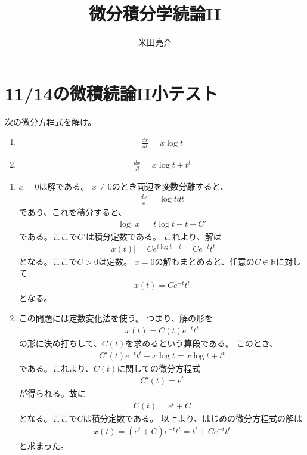 \documentclass{jsarticle}
\begin{document}
\title{微分積分学続論II}
\author{米田亮介}
\maketitle
\section{11/14の微積続論II小テスト}
\begin{shaded}
次の微分方程式を解け。
\begin{enumerate}
\item 
\begin{eqnarray}
\frac{dx}{dt}=x\log t
\end{eqnarray}
\item 
\begin{eqnarray}
\frac{dx}{dt}=x\log t+t^{t}
\end{eqnarray}
\end{enumerate}
\end{shaded}
\begin{enumerate}
\item 
$x=0$は解である。
$x\ne 0$のとき両辺を変数分離すると、
\begin{eqnarray}
\frac{dx}{x}=\log tdt
\end{eqnarray}
であり、これを積分すると、
\begin{eqnarray}
\log |x|=t\log t-t+C'
\end{eqnarray}
である。ここで$C'$は積分定数である。
これより、解は
\begin{eqnarray}
|x(t)|=Ce^{t\log t-t}=Ce^{-t}t^{t}
\end{eqnarray}
となる。ここで$C>0$は定数。
$x=0$の解もまとめると、任意の$C\in\mathbb{R}$に対して
\begin{eqnarray}
x(t)=Ce^{-t}t^{t}
\end{eqnarray}
となる。
\item
この問題には定数変化法を使う。
つまり、解の形を
\begin{eqnarray}
x(t)=C(t)e^{-t}t^{t}
\end{eqnarray}
の形に決め打ちして、$C(t)$を求めるという算段である。
このとき、
\begin{eqnarray}
C'(t)e^{-t}t^{t}+x\log t=x\log t+t^{t}
\end{eqnarray}
である。これより、$C(t)$に関しての微分方程式
\begin{eqnarray}
C'(t)=e^{t}
\end{eqnarray}
が得られる。故に
\begin{eqnarray}
C(t)=e^{t}+C
\end{eqnarray}
となる。ここで$C$は積分定数である。
以上より、はじめの微分方程式の解は
\begin{eqnarray}
x(t)=(e^{t}+C)e^{-t}t^{t}=t^{t}+Ce^{-t}t^{t}
\end{eqnarray}
と求まった。
\end{enumerate}
\end{document}
